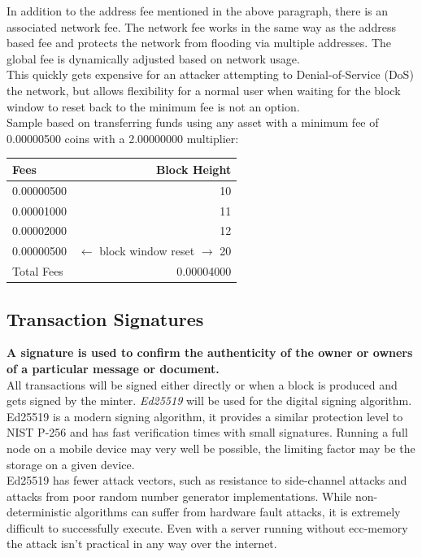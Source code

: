 \documentclass[12pt,a4paper]{article}
\begin{document}
  In addition to the address fee mentioned in the above paragraph, there is an
  associated  network fee. The network fee works in the same way as
  the address based fee and protects the network from flooding via multiple
  addresses. The global fee is dynamically adjusted based on network usage.\\

  This quickly gets expensive for an attacker attempting to
  \gls{Denial-of-Service} (DoS) the network, but allows flexibility for a normal
  user when waiting for the block window to reset back to the minimum fee is not
  an option.\\

  Sample based on transferring funds using any asset with a minimum fee of
  0.00000500 coins with a 2.00000000 multiplier:

  \vspace{3mm}
  \begin{tabular}{@{}lr@{}}
    Fees & Block Height     \\ \toprule
    0.00000500 & 10         \\
    0.00001000 & 11         \\
    0.00002000 & 12         \\
    0.00000500 & $\leftarrow{}$ block window reset $\rightarrow{}$ 20 \\ \midrule{}
    Total Fees & 0.00004000 \\
    \bottomrule
  \end{tabular}

  \subsection{Transaction Signatures}
  \textbf{A signature is used to confirm the authenticity of the owner or owners
  of a particular message or document.}\\

  All transactions will be signed either directly or when a block is produced
  and gets signed by the minter. \textit{Ed25519}\cite{ed25519} will be used for
  the digital signing algorithm. Ed25519 is a modern signing algorithm, it
  provides a similar protection level to NIST P-256 and has fast verification
  times with small signatures. Running a full node on a mobile device may very
  well be possible, the limiting factor may be the storage on a given device.\\

  Ed25519 has fewer attack vectors, such as resistance to side-channel attacks
  and attacks from poor random number generator implementations. While
  non-deterministic algorithms can suffer from hardware fault attacks, it is
  extremely difficult to successfully execute. Even with a server running
  without \gls{ecc-memory} the attack isn't practical in any way over the
  internet.
\end{document}
